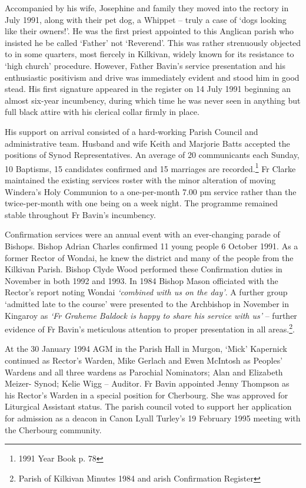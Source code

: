 Accompanied by his wife, Josephine and family they moved into the rectory in July 1991, along with their pet dog, a Whippet -- truly a case of `dogs looking like their owners!'. He was the first priest appointed to this Anglican parish who insisted he be called `Father' not `Reverend'. This was rather strenuously objected to in some quarters, most fiercely in Kilkivan, widely known for its resistance to `high church' procedure. However, Father Bavin's service presentation and his enthusiastic positivism and drive was immediately evident and stood him in good stead. His first signature appeared in the register on 14 July 1991 beginning an almost six-year incumbency, during which time he was never seen in anything but full black attire with his clerical collar firmly in place.

His support on arrival consisted of a hard-working Parish Council and administrative team. Husband and wife Keith and Marjorie Batts accepted the positions of Synod Representatives. An average of 20 communicants each Sunday, 10 Baptisms, 15 candidates confirmed and 15 marriages are recorded.\footnote{1991 Year Book p. 78} Fr Clarke maintained the existing services roster with the minor alteration of moving Windera's Holy Communion to a one-per-month 7.00 pm service rather than the twice-per-month with one being on a week night. The programme remained stable throughout Fr Bavin's incumbency.

Confirmation services were an annual event with an ever-changing parade of Bishops. Bishop Adrian Charles confirmed 11 young people 6 October 1991. As a former Rector of Wondai, he knew the district and many of the people from the Kilkivan Parish. Bishop Clyde Wood performed these Confirmation duties in November in both 1992 and 1993. In 1984 Bishop Mason officiated with the Rector's report noting Wondai \emph{`combined with us on the day'}. A further group `admitted late to the course' were presented to the Archbishop in November in Kingaroy as \emph{`Fr Graheme Baldock is happy to share his service with us'} -- further evidence of Fr Bavin's meticulous attention to proper presentation in all areas.\footnote{Parish of Kilkivan Minutes 1984 and arish Confirmation Register}.

At the 30 January 1994 AGM in the Parish Hall in Murgon, `Mick' Kapernick continued as Rector's Warden, Mike Gerlach and Ewen McIntosh as Peoples' Wardens and all three wardens as Parochial Nominators; Alan and Elizabeth Meizer- Synod; Kelie Wigg -- Auditor. Fr Bavin appointed Jenny Thompson as his Rector's Warden in a special position for Cherbourg. She was approved for Liturgical Assistant status. The parish council voted to support her application for admission as a deacon in Canon Lyall Turley's 19 February 1995 meeting with the Cherbourg community.

